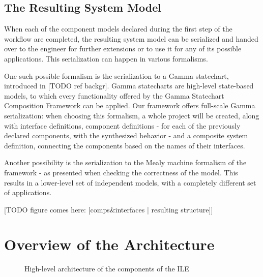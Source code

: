 \subsection{The Resulting System Model} \label{subs_resultingmodel}
When each of the component models declared during the first step of the workflow are completed, the resulting system model can be serialized and handed over to the engineer for further extensions or to use it for any of its possible applications. This serialization can happen in various formalisms.

One such possible formalism is the serialization to a Gamma statechart, introduced in [TODO ref backgr]. Gamma statecharts are high-level state-based models, to which every functionality offered by the Gamma Statechart Composition Framework can be applied. Our framework offers full-scale Gamma serialization: when choosing this formalism, a whole project will be created, along with interface definitions, component definitions - for each of the previously declared components, with the synthesized behavior - and a composite system definition, connecting the components based on the names of their interfaces.

Another possibility is the serialization to the Mealy machine formalism of the framework - as presented when checking the correctness of the model. This results in a lower-level set of independent models, with a completely different set of applications.

[TODO figure comes here: [comps\&interfaces | resulting structure]]
\clearpage
\section{Overview of the Architecture} \label{sec_architecture}

\begin{figure}[!ht] 
	\centering
	\caption{High-level architecture of the components of the ILE} 
	\label{fig_architcture_ileoverview}
\end{figure}

